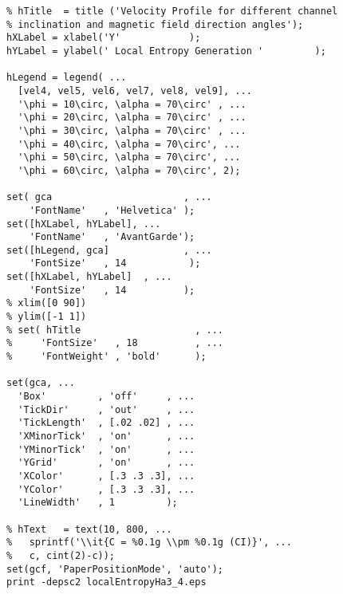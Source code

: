 \begin{lstlisting}
% hTitle  = title ('Velocity Profile for different channel 
% inclination and magnetic field direction angles');
hXLabel = xlabel('Y'            );  
hYLabel = ylabel(' Local Entropy Generation '         );

hLegend = legend( ...
  [vel4, vel5, vel6, vel7, vel8, vel9], ...
  '\phi = 10\circ, \alpha = 70\circ' , ...
  '\phi = 20\circ, \alpha = 70\circ' , ...
  '\phi = 30\circ, \alpha = 70\circ' , ...
  '\phi = 40\circ, \alpha = 70\circ', ...
  '\phi = 50\circ, \alpha = 70\circ', ...
  '\phi = 60\circ, \alpha = 70\circ', 2);

set( gca                       , ...
    'FontName'   , 'Helvetica' );
set([hXLabel, hYLabel], ...
    'FontName'   , 'AvantGarde');
set([hLegend, gca]             , ...
    'FontSize'   , 14           );
set([hXLabel, hYLabel]  , ...
    'FontSize'   , 14          );
% xlim([0 90])
% ylim([-1 1])
% set( hTitle                    , ...
%     'FontSize'   , 18          , ...
%     'FontWeight' , 'bold'      );

set(gca, ...
  'Box'         , 'off'     , ...
  'TickDir'     , 'out'     , ...
  'TickLength'  , [.02 .02] , ...
  'XMinorTick'  , 'on'      , ...
  'YMinorTick'  , 'on'      , ...
  'YGrid'       , 'on'      , ...
  'XColor'      , [.3 .3 .3], ...
  'YColor'      , [.3 .3 .3], ...
  'LineWidth'   , 1         );

% hText   = text(10, 800, ...
%   sprintf('\\it{C = %0.1g \\pm %0.1g (CI)}', ...
%   c, cint(2)-c));
set(gcf, 'PaperPositionMode', 'auto');
print -depsc2 localEntropyHa3_4.eps


\end{lstlisting}
